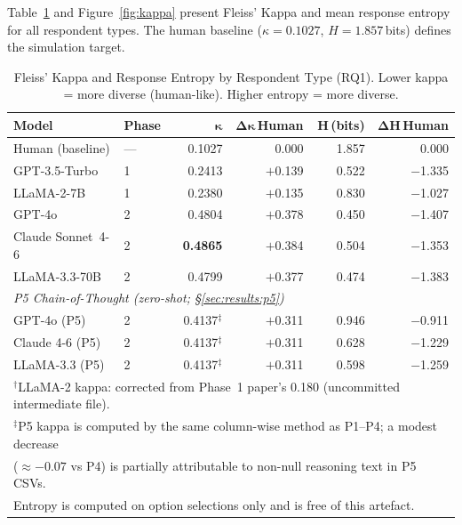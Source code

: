 \documentclass[12pt,a4paper]{article}
\begin{document}
Table~\ref{tab:kappa_entropy} and Figure~\ref{fig:kappa} present Fleiss'
Kappa and mean response entropy for all respondent types.
The human baseline ($\kappa{=}0.1027$, $H{=}1.857$\,bits) defines the
simulation target.

\begin{table}[ht]
\caption{Fleiss' Kappa and Response Entropy by Respondent Type (RQ1).
  Lower kappa = more diverse (human-like). Higher entropy = more diverse.}
\label{tab:kappa_entropy}
\centering\small
\begin{tabular}{llrrrr}
\toprule
\textbf{Model} & \textbf{Phase}
  & $\boldsymbol{\kappa}$ & $\boldsymbol{\Delta\kappa}$\,\textbf{Human}
  & $\boldsymbol{H}$\,\textbf{(bits)} & $\boldsymbol{\Delta H}$\,\textbf{Human} \\
\midrule
Human (baseline) & ---  & 0.1027 & 0.000  & 1.857 & 0.000  \\
\midrule
GPT-3.5-Turbo    & 1    & 0.2413 & $+$0.139 & 0.522 & $-$1.335 \\
LLaMA-2-7B       & 1    & 0.2380 & $+$0.135 & 0.830 & $-$1.027 \\
\midrule
GPT-4o           & 2    & 0.4804 & $+$0.378 & 0.450 & $-$1.407 \\
Claude Sonnet~4-6  & 2  & \textbf{0.4865} & $+$0.384 & 0.504 & $-$1.353 \\
LLaMA-3.3-70B    & 2    & 0.4799 & $+$0.377 & 0.474 & $-$1.383 \\
\midrule
\multicolumn{6}{l}{\footnotesize \textit{P5 Chain-of-Thought (zero-shot;
  §\ref{sec:results:p5})}} \\
GPT-4o (P5)      & 2    & 0.4137$^{\ddagger}$ & $+$0.311
  & 0.946 & $-$0.911 \\
Claude 4-6 (P5)  & 2    & 0.4137$^{\ddagger}$ & $+$0.311
  & 0.628 & $-$1.229 \\
LLaMA-3.3 (P5)   & 2    & 0.4137$^{\ddagger}$ & $+$0.311
  & 0.598 & $-$1.259 \\
\bottomrule
\multicolumn{6}{l}{\footnotesize $^{\dagger}$LLaMA-2 kappa: corrected
  from Phase~1 paper's 0.180 (uncommitted intermediate file).}\\
\multicolumn{6}{l}{\footnotesize $^{\ddagger}$P5 kappa is computed by the
  same column-wise method as P1--P4; a modest decrease}\\
\multicolumn{6}{l}{\footnotesize ($\approx{-}0.07$ vs P4) is partially
  attributable to non-null reasoning text in P5 CSVs.}\\
\multicolumn{6}{l}{\footnotesize Entropy is computed on option selections
  only and is free of this artefact.}\\
\end{tabular}
\end{table}
\end{document}
